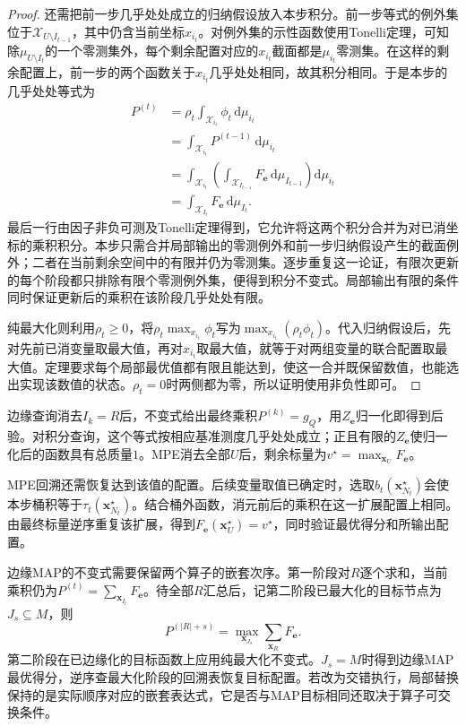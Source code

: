 \begin{proof}
  还需把前一步几乎处处成立的归纳假设放入本步积分。前一步等式的例外集位于$\mathcal{X}_{U\setminus I_{t-1}}$，其中仍含当前坐标$x_{i_t}$。对例外集的示性函数使用Tonelli定理，可知除$\mu_{U\setminus I_t}$的一个零测集外，每个剩余配置对应的$x_{i_t}$截面都是$\mu_{i_t}$零测集。在这样的剩余配置上，前一步的两个函数关于$x_{i_t}$几乎处处相同，故其积分相同。于是本步的几乎处处等式为
  \[
    \begin{aligned}
      P^{(t)}
      &=\rho_t\int_{\mathcal{X}_{i_t}}
          \phi_t\,\mathrm{d}\mu_{i_t}\\
      &=\int_{\mathcal{X}_{i_t}}
          P^{(t-1)}\,\mathrm{d}\mu_{i_t}\\
      &=\int_{\mathcal{X}_{i_t}}
          \left(\int_{\mathcal{X}_{I_{t-1}}}
            F_{\bm e}\,\mathrm{d}\mu_{I_{t-1}}\right)
          \mathrm{d}\mu_{i_t}\\
      &=\int_{\mathcal{X}_{I_t}}
          F_{\bm e}\,\mathrm{d}\mu_{I_t}.
    \end{aligned}
  \]
  最后一行由因子非负可测及Tonelli定理得到，它允许将这两个积分合并为对已消坐标的乘积积分。本步只需合并局部输出的零测例外和前一步归纳假设产生的截面例外；二者在当前剩余空间中的有限并仍为零测集。逐步重复这一论证，有限次更新的每个阶段都只排除有限个零测例外集，便得到积分不变式。局部输出有限的条件同时保证更新后的乘积在该阶段几乎处处有限。

  纯最大化则利用$\rho_t\geq0$，将$\rho_t\max_{x_{i_t}}\phi_t$写为$\max_{x_{i_t}}(\rho_t\phi_t)$。代入归纳假设后，先对先前已消变量取最大值，再对$x_{i_t}$取最大值，就等于对两组变量的联合配置取最大值。定理要求每个局部最优值都有限且能达到，使这一合并既保留数值，也能选出实现该数值的状态。$\rho_t=0$时两侧都为零，所以证明使用非负性即可。
\end{proof}

边缘查询消去$I_k=R$后，不变式给出最终乘积$P^{(k)}=g_Q$，用$Z_{\bm{e}}$归一化即得到后验。对积分查询，这个等式按相应基准测度几乎处处成立；正且有限的$Z_{\bm e}$使归一化后的函数具有总质量$1$。MPE消去全部$U$后，剩余标量为$v^\star=\max_{\bm{x}_U}F_{\bm{e}}$。

MPE回溯还需恢复达到该值的配置。后续变量取值已确定时，选取$b_t(\bm{x}_{N_t}^\star)$会使本步桶积等于$\tau_t(\bm{x}_{N_t}^\star)$。结合桶外函数，消元前后的乘积在这一扩展配置上相同。由最终标量逆序重复该扩展，得到$F_{\bm{e}}(\bm{x}_U^\star)=v^\star$，同时验证最优得分和所输出配置。

边缘MAP的不变式需要保留两个算子的嵌套次序。第一阶段对$R$逐个求和，当前乘积仍为$P^{(t)}=\sum_{\bm{x}_{I_t}}F_{\bm{e}}$。待全部$R$汇总后，记第二阶段已最大化的目标节点为$J_s\subseteq M$，则
\begin{equation}
  P^{(|R|+s)}
  =\max_{\bm{x}_{J_s}}\sum_{\bm{x}_R}F_{\bm{e}}.
  \label{eq:pgm-elimination-map-invariant}
\end{equation}
第二阶段在已边缘化的目标函数上应用纯最大化不变式。$J_s=M$时得到边缘MAP最优得分，逆序查最大化阶段的回溯表恢复目标配置。若改为交错执行，局部替换保持的是实际顺序对应的嵌套表达式，它是否与MAP目标相同还取决于算子可交换条件。

